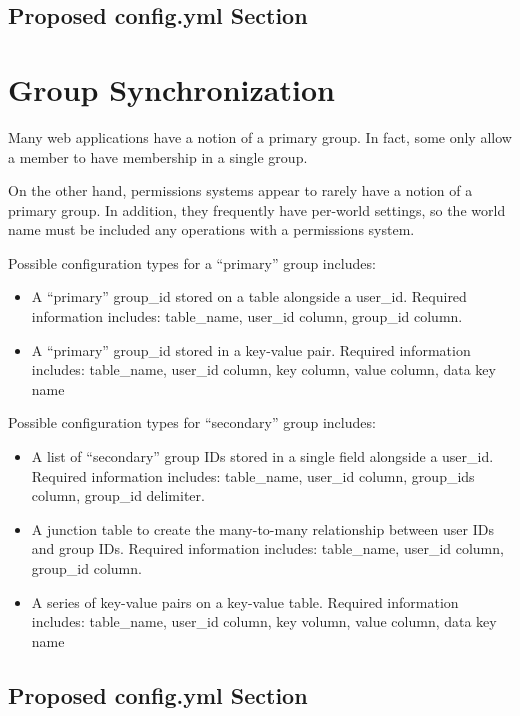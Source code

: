\documentclass[letterpaper,12pt]{article}
\begin{document}
  \subsection{Proposed config.yml Section}
  
  \clearpage
  \section{Group Synchronization}
  Many web applications have a notion of a primary group. In fact, some only
  allow a member to have membership in a single group.

  On the other hand, permissions systems appear to rarely have a notion of a
  primary group. In addition, they frequently have per-world settings, so the
  world name must be included any operations with a permissions system.

  Possible configuration types for a ``primary'' group includes:
  \begin{itemize}
   \item A ``primary'' group\_id stored on a table alongside a user\_id. Required
    information includes: table\_name, user\_id column, group\_id column.
   \item A ``primary'' group\_id stored in a key-value pair. Required information
    includes: table\_name, user\_id column, key column, value column, data key name
  \end{itemize}

  Possible configuration types for ``secondary'' group includes:
  \begin{itemize}
   \item A list of ``secondary'' group IDs stored in a single field alongside a
    user\_id. Required information includes: table\_name, user\_id column,
    group\_ids column, group\_id delimiter.
   \item A junction table to create the many-to-many relationship between
    user IDs and group IDs. Required information includes: table\_name, user\_id
    column, group\_id column.
   \item A series of key-value pairs on a key-value table. Required information
    includes: table\_name, user\_id column, key volumn, value column, data key name
  \end{itemize}


	\clearpage
  \subsection{Proposed config.yml Section}
  
  
\end{document}
